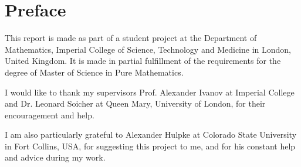 \chapter*{Preface}

This report is made as part of a student project at the Department of
Mathematics, Imperial College of Science, Technology and Medicine in
London, United Kingdom. It is made in partial fulfillment of the
requirements for the degree of Master of Science in Pure Mathematics.

I would like to thank my supervisors Prof. Alexander
Ivanov at Imperial College and Dr. Leonard Soicher at Queen Mary,
University of London, for their encouragement and help.

I am also particularly grateful to Alexander Hulpke at Colorado
State University in Fort Collins, USA, for suggesting this project to
me, and for his constant help and advice during my work.

